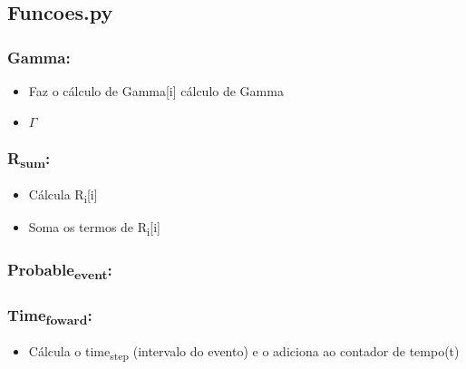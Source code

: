 \documentclass[11pt]{article}
\begin{document}
\subsection{Funcoes.py}
\label{sec:org72a91e7}
\subsubsection{Gamma:}
\label{sec:org035e9f3}
\begin{itemize}
\item Faz o cálculo de Gamma[i] cálculo de Gamma
\item \(\Gamma\)
\end{itemize}
\subsubsection{R\textsubscript{sum}:}
\label{sec:org1910e1c}
\begin{itemize}
\item Cálcula R\textsubscript{i}[i]
\item Soma os termos de R\textsubscript{i}[i]
\end{itemize}
\subsubsection{Probable\textsubscript{event}:}
\label{sec:orgcea480e}
\subsubsection{Time\textsubscript{foward}:}
\label{sec:org98e5ec4}
\begin{itemize}
\item Cálcula o time\textsubscript{step} (intervalo do evento) e o adiciona ao contador de tempo(t)
\end{itemize}
\end{document}
